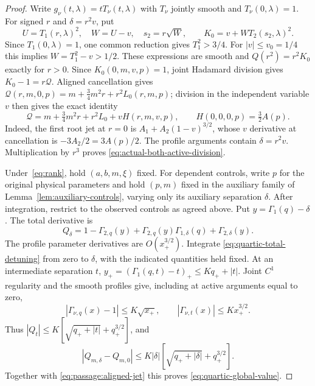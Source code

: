\begin{proof}
Write $g_\nu(t,\lambda)=tT_\nu(t,\lambda)$ with $T_\nu$ jointly smooth
and $T_\nu(0,\lambda)=1$. For signed $r$ and $\delta=r^2v$, put
\[
 U=T_1(r,\lambda)^2,\quad W=U-v,\quad s_2=r\sqrt W,
 \qquad K_0=v+WT_2(s_2,\lambda)^2.
\]
Since $T_1(0,\lambda)=1$, one common reduction gives $T_1^2>3/4$.
For $|v|\le v_0=1/4$ this implies $W=T_1^2-v>1/2$. These expressions are smooth and
$Q(r^2)=r^2K_0$ exactly for $r>0$. Since $K_0(0,m,v,p)=1$,
joint Hadamard division gives $K_0-1=r\mathcal Q$. Aligned cancellation gives
$\mathcal Q(r,m,0,p)=m+\tfrac34m^2r+r^2L_0(r,m,p)$; division in the independent
variable $v$ then gives the exact identity
\begin{equation}\label{eq:quartic-Hadamard}
 \mathcal Q=m+\tfrac34m^2r+r^2L_0+vH(r,m,v,p),
 \qquad H(0,0,0,p)=\tfrac32A(p).
\end{equation}
Indeed, the first root jet at $r=0$ is
$A_1+A_2(1-v)^{3/2}$, whose $v$ derivative at cancellation is
$-3A_2/2=3A(p)/2$. The profile arguments contain $\delta=r^2v$.
Multiplication by $r^3$ proves
\eqref{eq:actual-both-active-division}.

Under~\eqref{eq:rank}, hold $(a,b,m,\xi)$ fixed. For dependent controls,
write $p$ for the original physical parameters and hold $(p,m)$ fixed in
the auxiliary family of Lemma~\ref{lem:auxiliary-controls}, varying only
its auxiliary separation $\delta$. After integration, restrict to the
observed controls as agreed above. Put $y=\Gamma_1(q)-\delta$. The total
derivative is
\begin{equation}\label{eq:quartic-total-detuning}
 Q_\delta=1-\Gamma_{2,q}(y)
 +\Gamma_{2,q}(y)\Gamma_{1,\delta}(q)+\Gamma_{2,\delta}(y).
\end{equation}
The profile parameter derivatives are $O(x_+^{3/2})$. Integrate \eqref{eq:quartic-total-detuning} from zero to $\delta$,
with the indicated quantities held fixed. At an intermediate separation $t$,
$y_+=(\Gamma_1(q,t)-t)_+\le Kq_++|t|$. Joint $C^1$ regularity
and the smooth profiles give, including at active arguments equal to zero,
\[
 |\Gamma_{\nu,q}(x)-1|\le K\sqrt{x_+},\qquad
 |\Gamma_{\nu,t}(x)|\le Kx_+^{3/2}.
\]
Thus $|Q_t|\le K[\sqrt{q_++|t|}+q_+^{3/2}]$, and
\begin{equation}\label{eq:quartic-global-detuning}
 |Q_{m,\delta}-Q_{m,0}|
 \le K|\delta|[\sqrt{q_++|\delta|}+q_+^{3/2}].
\end{equation}
Together with \eqref{eq:passage:aligned-jet} this proves
\eqref{eq:quartic-global-value}.
\end{proof}

